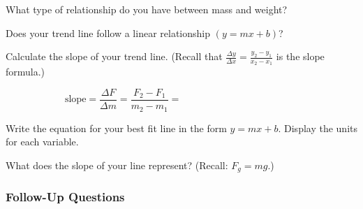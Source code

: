 \documentclass[]{exam}
\theoremstyle{definition}
\begin{document}
\begin{questions}    
\question
What type of relationship do you have between mass and weight?

\ifprintanswers
\else
\fillwithlines{7mm}
\fi

\question
Does your trend line follow a linear relationship $(y = mx + b)$?

\ifprintanswers
\else
\fillwithlines{7mm}
\fi


\question
Calculate the slope of your trend line. (Recall that $\displaystyle \frac{\Delta y}{\Delta x} = \frac{y_2 - y_1}{x_2 - x_1}$ is the slope formula.)

\begin{equation*}
    \text{slope} = \frac{\Delta F}{\Delta m} = \frac{F_2 - F_1}{m_2 - m_1} =
    \hspace{5cm}
\end{equation*}

\question
Write the equation for your best fit line in the form $y = mx + b$. Display the units for each variable.

\ifprintanswers
\else
\fillwithlines{7mm}
\fi


\question
What does the slope of your line represent? (Recall: $F_g = mg$.)

\ifprintanswers
\else
\fillwithlines{7mm}
\fi


\end{questions}

\subsubsection*{Follow-Up Questions}
\end{document}
